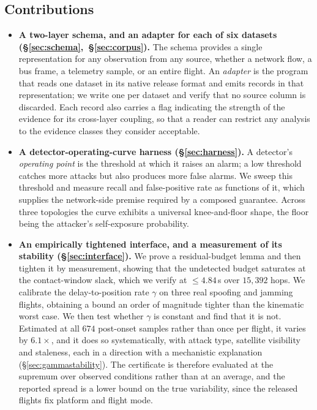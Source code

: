 \subsection*{Contributions}
\begin{itemize}
\item \textbf{A two-layer schema, and an adapter for each of six datasets
(\S\ref{sec:schema},~\S\ref{sec:corpus}).} The schema provides a single
representation for any observation from any source, whether a network flow, a
bus frame, a telemetry sample, or an entire flight. An \emph{adapter} is the
program that reads one dataset in its native release format and emits records in
that representation; we write one per dataset and verify that no source column
is discarded. Each record also carries a flag indicating the strength of the
evidence for its cross-layer coupling, so that a reader can restrict any
analysis to the evidence classes they consider acceptable.

\item \textbf{A detector-operating-curve harness (\S\ref{sec:harness}).} A
detector's \emph{operating point} is the threshold at which it raises an alarm;
a low threshold catches more attacks but also produces more false alarms. We
sweep this threshold and measure recall and false-positive rate as functions of
it, which supplies the network-side premise required by a composed guarantee.
Across three topologies the curve exhibits a universal knee-and-floor shape, the
floor being the attacker's self-exposure probability.

\item \textbf{An empirically tightened interface, and a measurement of its
stability (\S\ref{sec:interface}).} We prove a residual-budget lemma and then
tighten it by measurement, showing that the undetected budget saturates at the
contact-window slack, which we verify at $\le 4.84$\,s over $15{,}392$ hops. We
calibrate the delay-to-position rate $\gamma$ on three real spoofing and jamming
flights, obtaining a bound an order of magnitude tighter than the kinematic
worst case. We then test whether $\gamma$ is constant and find that it is not.
Estimated at all $674$ post-onset samples rather than once per flight, it varies
by $6.1\times$, and it does so systematically, with attack type, satellite
visibility and staleness, each in a direction with a mechanistic explanation
(\S\ref{sec:gammastability}). The certificate is therefore evaluated at the
supremum over observed conditions rather than at an average, and the reported
spread is a lower bound on the true variability, since the released flights fix
platform and flight mode.


\end{itemize}
